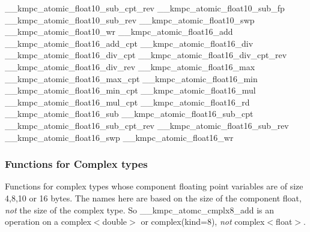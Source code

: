 \begin{DoxyCode}
\_\_kmpc\_atomic\_float10\_sub\_cpt\_rev
\_\_kmpc\_atomic\_float10\_sub\_fp
\_\_kmpc\_atomic\_float10\_sub\_rev
\_\_kmpc\_atomic\_float10\_swp
\_\_kmpc\_atomic\_float10\_wr
\_\_kmpc\_atomic\_float16\_add
\_\_kmpc\_atomic\_float16\_add\_cpt
\_\_kmpc\_atomic\_float16\_div
\_\_kmpc\_atomic\_float16\_div\_cpt
\_\_kmpc\_atomic\_float16\_div\_cpt\_rev
\_\_kmpc\_atomic\_float16\_div\_rev
\_\_kmpc\_atomic\_float16\_max
\_\_kmpc\_atomic\_float16\_max\_cpt
\_\_kmpc\_atomic\_float16\_min
\_\_kmpc\_atomic\_float16\_min\_cpt
\_\_kmpc\_atomic\_float16\_mul
\_\_kmpc\_atomic\_float16\_mul\_cpt
\_\_kmpc\_atomic\_float16\_rd
\_\_kmpc\_atomic\_float16\_sub
\_\_kmpc\_atomic\_float16\_sub\_cpt
\_\_kmpc\_atomic\_float16\_sub\_cpt\_rev
\_\_kmpc\_atomic\_float16\_sub\_rev
\_\_kmpc\_atomic\_float16\_swp
\_\_kmpc\_atomic\_float16\_wr
\end{DoxyCode}


\subsubsection*{Functions for Complex types }

Functions for complex types whose component floating point variables are of size 4,8,10 or 16 bytes. The names here are based on the size of the component float, {\itshape not} the size of the complex type. So {\ttfamily \-\_\-\-\_\-kmpc\-\_\-atomc\-\_\-cmplx8\-\_\-add} is an operation on a {\ttfamily complex$<$double$>$} or {\ttfamily complex(kind=8)}, {\itshape not} {\ttfamily complex$<$float$>$}.


